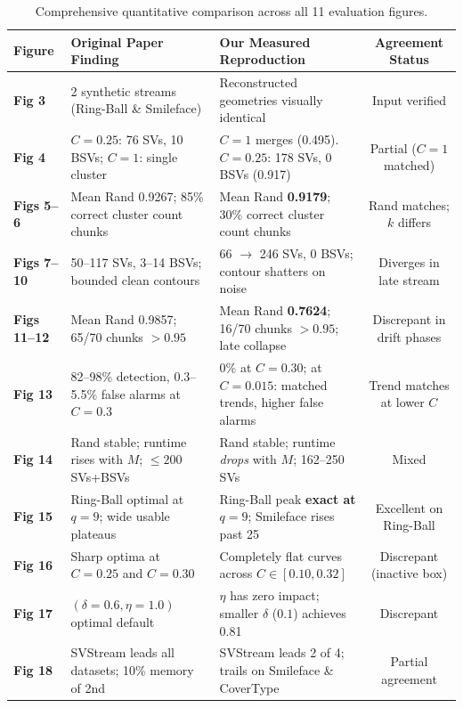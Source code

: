 \begin{table}[H]
\centering
\caption{Comprehensive quantitative comparison across all 11 evaluation figures.}
\label{tab:comprehensive_summary}
\small
\begin{tabularx}{\textwidth}{@{}l L L c@{}}
\toprule
\textbf{Figure} & \textbf{Original Paper Finding} & \textbf{Our Measured Reproduction} & \textbf{Agreement Status} \\
\midrule
\textbf{Fig 3} & 2 synthetic streams (Ring-Ball \& Smileface) & Reconstructed geometries visually identical & Input verified \\
\textbf{Fig 4} & $C=0.25$: 76 SVs, 10 BSVs; $C=1$: single cluster & $C=1$ merges (0.495). $C=0.25$: 178 SVs, 0 BSVs (0.917) & Partial ($C=1$ matched) \\
\textbf{Figs 5--6} & Mean Rand 0.9267; 85\% correct cluster count chunks & Mean Rand \textbf{0.9179}; 30\% correct cluster count chunks & Rand matches; $k$ differs \\
\textbf{Figs 7--10} & 50--117 SVs, 3--14 BSVs; bounded clean contours & 66 $\to$ 246 SVs, 0 BSVs; contour shatters on noise & Diverges in late stream \\
\textbf{Figs 11--12} & Mean Rand 0.9857; 65/70 chunks $>0.95$ & Mean Rand \textbf{0.7624}; 16/70 chunks $>0.95$; late collapse & Discrepant in drift phases \\
\textbf{Fig 13} & 82--98\% detection, 0.3--5.5\% false alarms at $C=0.3$ & 0\% at $C=0.30$; at $C=0.015$: matched trends, higher false alarms & Trend matches at lower $C$ \\
\textbf{Fig 14} & Rand stable; runtime rises with $M$; $\le 200$ SVs+BSVs & Rand stable; runtime \emph{drops} with $M$; 162--250 SVs & Mixed \\
\textbf{Fig 15} & Ring-Ball optimal at $q=9$; wide usable plateaus & Ring-Ball peak \textbf{exact at $q=9$}; Smileface rises past 25 & Excellent on Ring-Ball \\
\textbf{Fig 16} & Sharp optima at $C=0.25$ and $C=0.30$ & Completely flat curves across $C \in [0.10, 0.32]$ & Discrepant (inactive box) \\
\textbf{Fig 17} & $(\delta=0.6, \eta=1.0)$ optimal default & $\eta$ has zero impact; smaller $\delta$ ($0.1$) achieves 0.81 & Discrepant \\
\textbf{Fig 18} & SVStream leads all datasets; 10\% memory of 2nd & SVStream leads 2 of 4; trails on Smileface \& CoverType & Partial agreement \\
\bottomrule
\end{tabularx}
\end{table}

